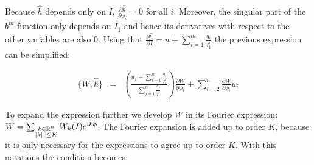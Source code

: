 

Because $\hat{h}$ depends only on $I$, $\frac{\partial \hat{h}}{\partial \phi_i} = 0$ for all $i$. Moreover, the singular part of the $b^m$-function only depends on $I_1$ and hence its derivatives with respect to the other variables are also 0. Using that $\frac{\partial \hat{h}}{\partial I} = u + \sum_{i = 1}^{m}\frac{\hat{q}_i}{I_1^i}$ the previous expression can be  simplified:

$$
\begin{array}{rcl}
\{W,\hat{h}\} & = & \displaystyle \left(\frac{u_1 + \sum_{i = 1}^{m}\frac{\hat{q}_i}{I_1^i}}{\sum_{j = 1}^m \frac{c_j}{I_1^j}}\right)\frac{\partial W}{\partial \phi_1} + \displaystyle\sum_{i = 2}^n \frac{\partial W}{\partial \phi_i}u_i
\end{array}
$$

To expand the expression further we develop $W$ in its Fourier expression: $W=\sum_{\begin{subarray}{c} k\in\mathbb{R}^n \\ |k|_1 \leq K\end{subarray}}W_k(I)e^{ik\phi}$. The Fourier expansion is added up to order $K$, because it is only necessary for the expressions to agree up to order $K$. With this notations the condition becomes:

